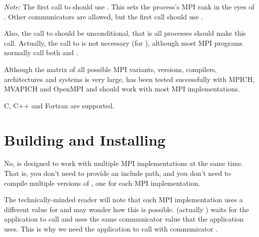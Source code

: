 \documentclass[11pt,letterpaper]{report}
\begin{document}
\emph{Note:} The first call to  should use .
This sets the process's MPI rank in the eyes of \hpcrun{}.
Other communicators are allowed, but the first call should use .

Also, the call to  should be unconditional, that is all processes should make this call.
Actually, the call to  is not necessary (for \hpcrun{}), although most MPI programs normally call both  and .

\vspace{1ex}


\answer{}
Although the matrix of all possible MPI variants, versions, compilers, architectures and systems is very large, \HPCToolkit{} has been tested successfully with MPICH, MVAPICH and OpenMPI and should work with most MPI implementations.

\vspace{1ex}


\answer{}
C, C++ and Fortran are supported.


\section{Building and Installing \HPCToolkit{}}


\answer{}
No, \HPCToolkit{} is designed to work with multiple MPI implementations at the same time.
That is, you don't need to provide an  include path, and you don't need to compile multiple versions of \HPCToolkit{}, one for each MPI implementation.

The technically-minded reader will note that each MPI implementation uses a different value for  and may wonder how this is possible.
\hpcrun{} (actually ) waits for the application to call  and uses the same communicator value that the application uses.
This is why we need the application to call  with communicator .
\end{document}
